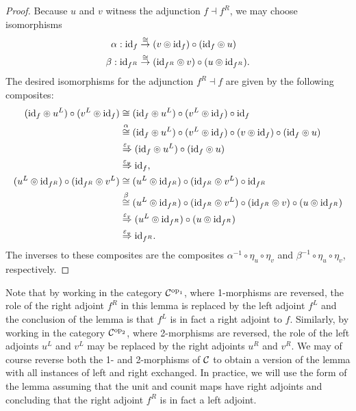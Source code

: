 \documentclass{amsart}
\begin{document}
\begin{proof}
Because $u$ and $v$ witness the adjunction $f \dashv f^R$, we may choose isomorphisms
\begin{align*}
	\alpha: \mathrm{id}_f &\stackrel{\cong}{\to} (v \circledcirc \mathrm{id}_f) \circ (\mathrm{id}_f \circledcirc u) \\
	\beta: \mathrm{id}_{f^R} &\stackrel{\cong}{\to} (\mathrm{id}_{f^R} \circledcirc v) \circ (u \circledcirc \mathrm{id}_{f^R} ).
\end{align*}
The desired isomorphisms for the adjunction $f^R \dashv f$ are given by the following composites:
\begin{align*}
	(\mathrm{id}_{f} \circledcirc u^L) \circ (v^L \circledcirc \mathrm{id}_{f} )
		& \cong (\mathrm{id}_{f} \circledcirc u^L) \circ (v^L \circledcirc \mathrm{id}_{f} ) \circ \mathrm{id}_f\\
		& \stackrel{\alpha}{\cong} (\mathrm{id}_{f} \circledcirc u^L) \circ (v^L \circledcirc \mathrm{id}_{f} ) \circ (v \circledcirc \mathrm{id}_f) \circ (\mathrm{id}_f \circledcirc u) \\
		&  \stackrel{\varepsilon_v }{\Rightarrow} (\mathrm{id}_{f} \circledcirc u^L) \circ (\mathrm{id}_f \circledcirc u) \\
		& \stackrel{\varepsilon_u }{\Rightarrow} \mathrm{id}_{f},  \\
	(u^L \circledcirc \mathrm{id}_{f^R}) \circ (\mathrm{id}_{f^R} \circledcirc v^L) 
		& \cong  (u^L \circledcirc \mathrm{id}_{f^R}) \circ (\mathrm{id}_{f^R} \circledcirc v^L) \circ \mathrm{id}_{f^R} \\
		& \stackrel{\beta}{\cong}  (u^L \circledcirc \mathrm{id}_{f^R}) \circ (\mathrm{id}_{f^R} \circledcirc v^L) \circ (\mathrm{id}_{f^R} \circledcirc v) \circ (u \circledcirc \mathrm{id}_{f^R} ) \\
		& \stackrel{\varepsilon_v }{\Rightarrow} (u^L \circledcirc \mathrm{id}_{f^R}) \circ (u \circledcirc \mathrm{id}_{f^R} ) \\
		& \stackrel{\varepsilon_u }{\Rightarrow} \mathrm{id}_{f^R}.
\end{align*}
The inverses to these composites are the composites $\alpha^{-1} \circ \eta_u \circ \eta_v$ and $\beta^{-1} \circ \eta_u \circ \eta_v$, respectively.
\end{proof}

Note that by working in the category $\mathcal C^{\mathrm{op}_1}$, where 1-morphisms are reversed, the role of the right adjoint $f^R$ in this lemma is replaced by the left adjoint $f^L$ and the conclusion of the lemma is that $f^L$ is in fact a right adjoint to $f$.  Similarly, by working in the category $\mathcal C^{\mathrm{op}_2}$, where 2-morphisms are reversed, the role of the left adjoints $u^L$ and $v^L$ may be replaced by the right adjoints $u^R$ and $v^R$.  We may of course reverse both the 1- and 2-morphisms of $\mathcal C$ to obtain a version of the lemma with all instances of left and right exchanged.  In practice, we will use the form of the lemma assuming that the unit and counit maps have right adjoints and concluding that the right adjoint $f^R$ is in fact a left adjoint.
\end{document}
